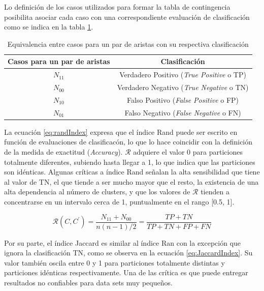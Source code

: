 Lo definici\'on de los casos utilizados para formar la tabla de contingencia posibilita asociar cada caso con una correspondiente evaluaci\'on de clasificaci\'on como se indica en la tabla \ref{tab:EquivParesClasificacion}.

\begin{table}[h]
    \centering
    \begin{tabular}{|c|c|}
    \hline
        Casos para un par de aristas & Clasificaci\'on \\ \hline
        $N_{11}$ & Verdadero Positivo ({\it True Positive} o TP) \\
        $N_{00}$ & Verdadero Negativo ({\it True Negative} o TN)\\
        $N_{10}$ & Falso Positivo ({\it False Positive} o FP)\\
        $N_{01}$ & Falso Negativo ({\it False Negative} o FN)\\ \hline
    \end{tabular}
    \caption{Equivalencia entre casos para un par de aristas con su respectiva clasificaci\'on}
    \label{tab:EquivParesClasificacion}
\end{table}

La ecuaci\'on \eqref{eq:randIndex} expresa que el \'indice Rand puede ser escrito en funci\'on de evaluaciones de clasificac\'on, lo que lo hace coincidir con la definici\'on de la medida de exactitud ({\it Accuracy}). $\mathcal{R}$ adquiere el valor 0 para particiones totalmente diferentes, subiendo hasta llegar a 1, lo que indica que las particiones son id\'enticas. Algunas cr\'iticas a \'indice Rand se\~nalan la alta sensibilidad que tiene al valor de TN, el que tiende a ser mucho mayor que el resto\cite{ben2001stability}, la existencia de una alta dependencia al n\'umero de clusters\cite{wagner2007comparing}, y que los valores de $\mathcal{R}$ tienden a concentrarse en un intervalo cerca de 1, puntualmente en el rango [0.5, 1]\cite{meilua2007comparing}\cite{vinh2010information}.

\begin{equation}
\mathcal{R}(C,C^{\prime}) = \frac{N_{11} + N_{00}}{n(n-1)/2} = \frac{TP + TN}{TP + TN + FP + FN}
\label{eq:randIndex}
\end{equation}

Por su parte, el \'indice Jaccard es similar al \'indice Ran con la excepci\'on que ignora la clasificaci\'on TN, como se observa en la ecuaci\'on \eqref{eq:JaccardIndex}. Su valor tambi\'en oscila entre 0 y 1 para particiones totalmente distintas y particiones id\'enticas respectivamente. Una de las cr\'itica es que puede entregar resultados no confiables para data sets muy peque\~nos.

